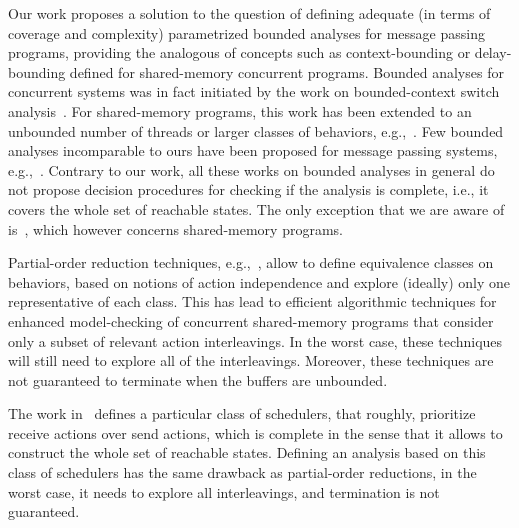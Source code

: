 Our work proposes a solution to the question of defining adequate (in terms of coverage and complexity) parametrized bounded analyses for message passing programs, providing the analogous of concepts such as context-bounding or delay-bounding defined for shared-memory concurrent programs. Bounded analyses for concurrent systems
was in fact initiated by the work on bounded-context switch analysis~\cite{DBLP:conf/pldi/QadeerW04,DBLP:conf/tacas/QadeerR05,DBLP:conf/cav/LalR08}. For shared-memory programs, this work has been extended to an unbounded number of threads or larger classes of behaviors, e.g.,~\cite{DBLP:conf/sas/BouajjaniEP11,DBLP:conf/popl/EmmiQR11,DBLP:conf/spin/KiddJV10,DBLP:conf/cav/TorreMP10}. Few bounded analyses incomparable to ours have been proposed for message passing systems, e.g.,~\cite{DBLP:conf/tacas/TorreMP08,DBLP:conf/tacas/BouajjaniE12}. Contrary to our work, all these works on bounded analyses in general do not propose decision procedures for checking if the analysis is complete, i.e., it covers the whole set of reachable states. The only exception that we are aware of is~\cite{DBLP:conf/cav/TorreMP10}, which however concerns shared-memory programs.  

Partial-order reduction techniques, e.g.,~\cite{DBLP:conf/popl/AbdullaAJS14,DBLP:conf/popl/FlanaganG05}, allow to define equivalence classes on behaviors, based on notions of action independence and explore (ideally) only one representative of each class. This has lead to efficient algorithmic techniques for enhanced model-checking of concurrent shared-memory programs that consider only a subset of relevant action interleavings. In the worst case, these techniques will still need to explore all of the interleavings. Moreover, these techniques are not guaranteed to terminate when the buffers are unbounded.

The work in~\cite{DBLP:conf/oopsla/Desai0M14} defines a particular class of schedulers, that roughly, prioritize receive actions over send actions, which is complete in the sense that it allows to construct the whole set of reachable states. Defining an analysis based on this class of schedulers has the same drawback as partial-order reductions, in the worst case, it needs to explore all interleavings, and termination is not guaranteed. 


